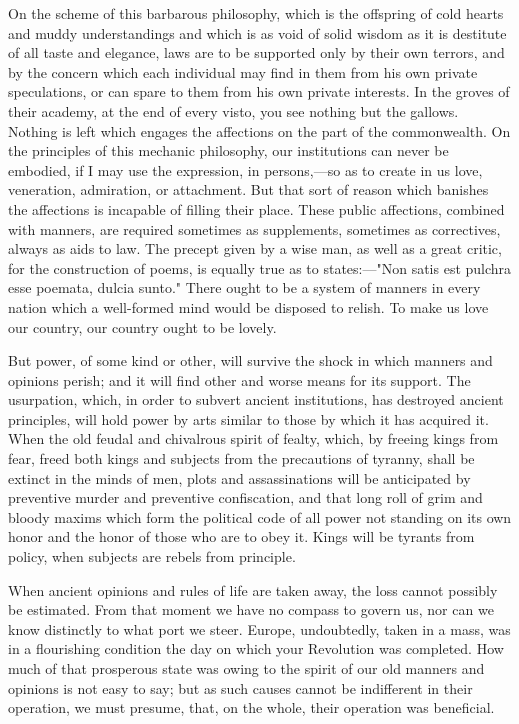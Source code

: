 On the scheme of this barbarous philosophy, which is the offspring of cold hearts and muddy understandings and which is as void of solid wisdom as it is destitute of all taste and elegance, laws are to be supported only by their own terrors, and by the concern which each individual may find in them from his own private speculations, or can spare to them from his own private interests. In the groves of their academy, at the end of every visto, you see nothing but the gallows. Nothing is left which engages the affections on the part of the commonwealth. On the principles of this mechanic philosophy, our institutions can never be embodied, if I may use the expression, in persons,—so as to create in us love, veneration, admiration, or attachment. But that sort of reason which banishes the affections is incapable of filling their place. These public affections, combined with manners, are required sometimes as supplements, sometimes as correctives, always as aids to law. The precept given by a wise man, as well as a great critic, for the construction of poems, is equally true as to states:—"Non satis est pulchra esse poemata, dulcia sunto." There ought to be a system of manners in every nation which a well-formed mind would be disposed to relish. To make us love our country, our country ought to be lovely.

But power, of some kind or other, will survive the shock in which manners and opinions perish; and it will find other and worse means for its support. The usurpation, which, in order to subvert ancient institutions, has destroyed ancient principles, will hold power by arts similar to those by which it has acquired it. When the old feudal and chivalrous spirit of fealty, which, by freeing kings from fear, freed both kings and subjects from the precautions of tyranny, shall be extinct in the minds of men, plots and assassinations will be anticipated by preventive murder and preventive confiscation, and that long roll of grim and bloody maxims which form the political code of all power not standing on its own honor and the honor of those who are to obey it. Kings will be tyrants from policy, when subjects are rebels from principle.

When ancient opinions and rules of life are taken away, the loss cannot possibly be estimated. From that moment we have no compass to govern us, nor can we know distinctly to what port we steer. Europe, undoubtedly, taken in a mass, was in a flourishing condition the day on which your Revolution was completed. How much of that prosperous state was owing to the spirit of our old manners and opinions is not easy to say; but as such causes cannot be indifferent in their operation, we must presume, that, on the whole, their operation was beneficial.

